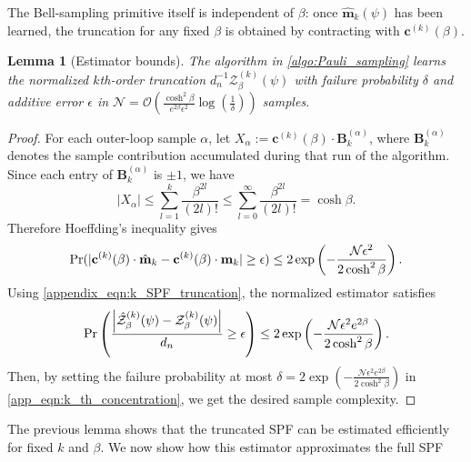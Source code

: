 \documentclass[aps,pra,superscriptaddress,twocolumn,longbibliography]{revtex4-2}
\newcounter{algorithm}
\newtheorem{lemma}{\textbf{Lemma}}
\begin{document}
The Bell-sampling primitive itself is independent of $\beta$: once $\hat{\mathbf{m}}_{k}(\psi)$ has been learned, the truncation for any fixed $\beta$ is obtained by contracting with $\mathbf{c}^{(k)}(\beta)$.

\begin{lemma}[Estimator bounds]\label{app_lemma:k_order_stimator}
The algorithm in \ref{algo:Pauli_sampling} learns the normalized $k$th-order truncation $d_n^{-1}\mathcal{Z}^{(k)}_{\beta}(\psi)$ with failure probability $\delta$ and additive error $\epsilon$ in $\mathcal{N}=\mathcal{O}\left(\frac{\cosh^{2}{\beta}}{e^{2\beta}\epsilon^{2}}\log\left(\frac{1}{\delta}\right)\right)$ samples.
\end{lemma}

\begin{proof}
For each outer-loop sample $\alpha$, let $X_{\alpha}:=\mathbf{c}^{(k)}(\beta)\cdot\mathbf{B}_{k}^{(\alpha)}$, where $\mathbf{B}_{k}^{(\alpha)}$ denotes the sample contribution accumulated during that run of the algorithm. Since each entry of $\mathbf{B}_{k}^{(\alpha)}$ is $\pm 1$, we have
%
\begin{equation}
    |X_{\alpha}|\leq \sum_{l=1}^{k}\frac{\beta^{2l}}{(2l)!}\leq \sum_{l=0}^{\infty}\frac{\beta^{2l}}{(2l)!}=\cosh{\beta}.
\end{equation}
%
Therefore Hoeffding's inequality gives
%
\begin{equation}
    {\rm Pr}(|\mathbf{c}^{(k)}(\beta)\cdot\hat{\mathbf{m}}_{k}- \mathbf{c}^{(k)}(\beta)\cdot\mathbf{m}_{k}| \geq \epsilon) \leq 2\exp\left(-\frac{\mathcal{N} \epsilon^{2}}{2\cosh^{2}{\beta}}\right).
\end{equation}
%
Using \eqref{appendix_eqn:k_SPF_truncation}, the normalized estimator satisfies
%
\begin{equation}
    \label{app_eqn:k_th_concentration}
    {\rm Pr}\left(\frac{\left|\hat{\mathcal{Z}}^{(k)}_{\beta}(\psi)- \mathcal{Z}^{(k)}_{\beta}(\psi)\right|}{d_{n}} \geq \epsilon\right) \leq 2\exp\left(-\frac{\mathcal{N} \epsilon^{2} e^{2\beta}}{2\cosh^{2}{\beta}}\right).
\end{equation}
%
Then, by setting the failure probability at most $\delta=2\exp\left(-\frac{\mathcal{N} \epsilon^{2} e^{2\beta}}{2\cosh^{2}{\beta}}\right)$ in \eqref{app_eqn:k_th_concentration}, we get the desired sample complexity.

\end{proof}

The previous lemma shows that the truncated SPF can be estimated efficiently for fixed $k$ and $\beta$. We now show how this estimator approximates the full SPF
\end{document}
